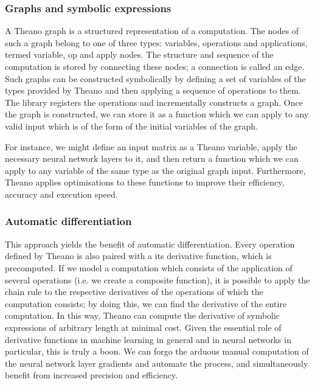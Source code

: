 \subsubsection{Graphs and symbolic expressions}
\label{sec:graph}
A Theano graph is a structured representation of a computation. The
nodes of such a graph belong to one of three types: variables,
operations and applications, termed variable, op and apply nodes. The
structure and sequence of the computation is stored by connecting
these nodes; a connection is called an edge. Such graphs can be
constructed symbolically by defining a set of variables of the types
provided by Theano and then applying a sequence of operations to
them. The library registers the operations and incrementally
constructs a graph. Once the graph is constructed, we can store it as
a function which we can apply to any valid input which is of the form
of the initial variables of the graph.

For instance, we might define an input matrix as a Theano variable,
apply the necessary neural network layers to it, and then return a
function which we can apply to any variable of the same type as the
original graph input. Furthermore, Theano applies optimisations to
these functions to improve their efficiency, accuracy and execution
speed.

\subsubsection{Automatic differentiation}
\label{sec:autodiff}
This approach yields the benefit of automatic differentiation. Every
operation defined by Theano is also paired with a its derivative
function, which is precomputed. If we model a computation which
consists of the application of several operations (i.e. we create a
composite function), it is possible to apply the chain rule to the
respective derivatives of the operations of which the computation
consists; by doing this, we can find the derivative of the entire
computation. In this way, Theano can compute the derivative of
symbolic expressions of arbitrary length at minimal cost. Given the
essential role of derivative functions in machine learning in general
and in neural networks in particular, this is truly a boon. We can
forgo the arduous manual computation of the neural network layer
gradients and automate the process, and simultaneously benefit from
increased precision and efficiency.

